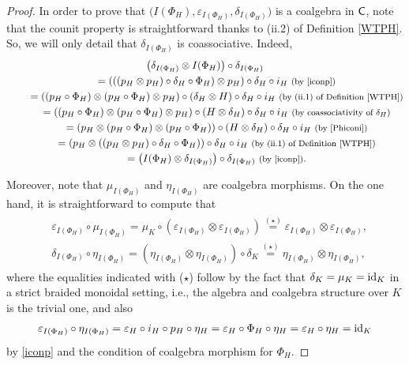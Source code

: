 \documentclass[10pt,a4paper]{amsart}
\numberwithin{equation}{section}
\begin{document}
\begin{proof}
In order to prove that $\bigl(I(\Phi_{H}),\varepsilon_{I(\Phi_{H})},\delta_{I(\Phi_{H})}\bigr)$ is a coalgebra in $\sf{C}$, note that the counit property is straightforward thanks to (ii.2) of Definition \ref{WTPH}. So, we will only detail that $\delta_{I(\Phi_{H})}$ is coassociative. Indeed,
\begin{gather*}
 \bigl(\delta_{I(\Phi_{H})}\otimes I(\Phi_{H})\bigr)\circ \delta_{I(\Phi_{H})}\\
 \qquad{}= (((p_{H}\otimes p_{H})\circ\delta_{H}\circ\Phi_{H})\otimes p_{H})\circ\delta_{H}\circ i_{H}\ \text{\footnotesize\textnormal{(by \eqref{iconp})}}\\
 \qquad{}= ((p_{H}\circ \Phi_{H})\otimes(p_{H}\circ \Phi_{H})\otimes p_{H})\circ(\delta_{H}\otimes H)\circ\delta_{H}\circ i_{H}\ \text{\footnotesize\textnormal{(by (ii.1) of Definition \ref{WTPH})}}\\
 \qquad{}= ((p_{H}\circ\Phi_{H})\otimes (p_{H}\circ \Phi_{H})\otimes p_{H})\circ(H\otimes \delta_{H})\circ\delta_{H}\circ i_{H}\ \text{\footnotesize\textnormal{(by coassociativity of $\delta_{H}$)}}\\
 \qquad{}= (p_{H}\otimes(p_{H}\circ\Phi_{H})\otimes(p_{H}\circ \Phi_{H}))\circ(H\otimes\delta_{H})\circ\delta_{H}\circ i_{H}\ \text{\footnotesize\textnormal{(by \eqref{Phiconi})}}\\
 \qquad{}= (p_{H}\otimes((p_{H}\otimes p_{H})\circ\delta_{H}\circ\Phi_{H}))\circ\delta_{H}\circ i_{H}\ \text{\footnotesize\textnormal{(by (ii.1) of Definition \ref{WTPH})}}\\
 \qquad{}= \bigl(I(\Phi_{H})\otimes\delta_{I(\Phi_{H})}\bigr)\circ\delta_{I(\Phi_{H})}\ \text{\footnotesize\textnormal{(by \eqref{iconp})}}.
\end{gather*}

Moreover, note that $\mu_{I(\Phi_{H})}$ and $\eta_{I(\Phi_{H})}$ are coalgebra morphisms. On the one hand, it is straightforward to compute that
\begin{gather*}
\begin{split}
& \varepsilon_{I(\Phi_{H})}\circ\mu_{I(\Phi_{H})}=\mu_{K}\circ(\varepsilon_{I(\Phi_{H})}\otimes\varepsilon_{I(\Phi_{H})})\overset{(\star)}{=}\varepsilon_{I(\Phi_{H})} \otimes\varepsilon_{I(\Phi_{H})},\\
& \delta_{I(\Phi_{H})}\circ\eta_{I(\Phi_{H})}=(\eta_{I(\Phi_{H})}\otimes \eta_{I(\Phi_{H})})\circ\delta_{K}\overset{(\star)}{=}\eta_{I(\Phi_{H})}\otimes \eta_{I(\Phi_{H})},
\end{split}
\end{gather*}
where the equalities indicated with ($\star$) follow by the fact that $\delta_{K}=\mu_{K}={\rm id}_{K}$ in a strict braided monoidal setting, i.e., the algebra and coalgebra structure over $K$ is the trivial one, and also
\begin{align*}
\varepsilon_{I(\Phi_{H})}\circ\eta_{I(\Phi_{H})}=\varepsilon_{H}\circ i_{H}\circ p_{H}\circ \eta_{H}=\varepsilon_{H}\circ\Phi_{H}\circ\eta_{H}=\varepsilon_{H}\circ\eta_{H}={\rm id}_{K}
\end{align*}
by \eqref{iconp} and the condition of coalgebra morphism for $\Phi_{H}$.


\end{proof}
\end{document}
